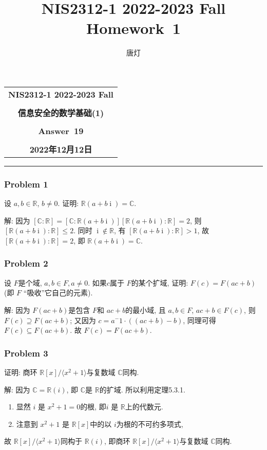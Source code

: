 \documentclass[a4paper,12pt]{ctexart}
\title{NIS2312-1 2022-2023 Fall Homework~1}
\author{唐灯}
\newcommand{\Com}{\mathbb{C}}
\newcommand{\R}{\mathbb{R}}
\begin{document}
  \begin{center}

  \vspace{-0.3in}
  \begin{tabular}{c}
    \textbf{\Large NIS2312-1 2022-2023 Fall} \\
    \textbf{\Large  } \\
    \textbf{\Large  信息安全的数学基础(1)} \\
    \textbf{\Large  } \\
    \textbf{\Large  Answer~19} \\
    \textbf{\Large  } \\
    \textbf{\Large 2022年12月12日} \\
  \end{tabular}
  \end{center}
  \noindent
  \rule{\linewidth}{0.4pt}
  

\subsubsection*{Problem 1}
    设 $ a,b\in\R $, $ b\ne 0 $. 证明: $ \R(a+b\operatorname{i})=\Com $.

    解: 因为 $ \left[ \Com:\R \right]=\left[ \Com:\R(a+b\operatorname{i}) \right]\left[ \R(a+b\operatorname{i}):\R \right]=2 $, 
    则 $ \left[ \R(a+b\operatorname{i}):\R \right]\le 2 $. 
    同时 $ \operatorname{i}\notin\R $, 有 $ \left[ \R(a+b\operatorname{i}):\R \right]>1 $, 
    故$ \left[ \R(a+b\operatorname{i}):\R \right]= 2 $, 即 $ \R(a+b\operatorname{i})=\Com $.

\subsubsection*{Problem 2}
    设 $ F $是个域, $ a,b\in F,a\ne 0 $. 如果$ c $属于 $ F $的某个扩域, 证明: $ F(c)=F(ac+b) $(即 $ F $ ``吸收''它自己的元素).
    
    解: 因为 $ F(ac+b) $是包含 $ F $和 $ ac+b $的最小域, 且 $ a,b\in F $, $ ac+b\in F(c) $, 则 $ F(c)\supseteq F(ac+b) $;
    又因为 $ c=a^-1\cdot((ac+b)-b) $, 同理可得 $ F(c)\subseteq F(ac+b) $. 
    故 $ F(c)=F(ac+b) $.

\subsubsection*{Problem 3}
    证明: 商环 $ \R[x]/\langle x^2+1\rangle $与复数域 $ \Com $同构. 

    解: 因为 $ \Com=\R(i) $, 即 $ \Com $是 $ \R $的扩域. 
    所以利用定理5.3.1.
    \begin{enumerate}[label=(\arabic{*})]
      \item 显然 $ i $ 是 $ x^2+1=0 $的根, 即$ i $ 是 $ \R $上的代数元.
      \item 注意到 $ x^2+1 $ 是 $ \R[x] $中的以 $ i $为根的不可约多项式, 
    \end{enumerate}
    故 $ \R[x]/\langle x^2+1\rangle $同构于 $ \R(i) $, 即商环 $ \R[x]/\langle x^2+1\rangle $与复数域 $ \Com $同构. 
\end{document}
